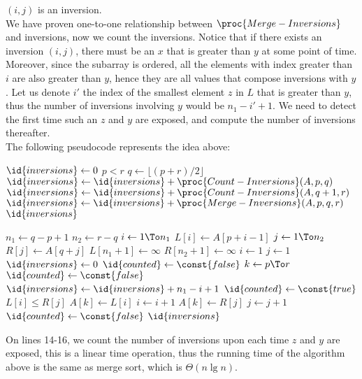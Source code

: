 \begin{enumerate}[leftmargin=*]
		$(i,j)$ is an inversion.\\
		We have proven one-to-one relationship between
		$\proc{Merge-Inversions}$ and inversions, now
		we count the inversions. Notice that if there
		exists an inversion $(i,j)$, there must be
		an $x$ that is greater than $y$ at some point
		of time. Moreover, since the subarray is ordered, 
		all the elements with index greater than $i$ are
		also greater than $y$, hence they are all
		values that compose inversions with $y$. Let
		us denote $i'$ the index of the smallest element
		$z$ in $L$ that is greater than $y$, thus the 
		number of inversions involving $y$ would be
		$n_1-i'+1$. We need to detect the first time
		such an $z$ and $y$ are exposed, and compute
		the number of inversions thereafter.\\
		The following pseudocode represents the idea
		above:
		\begin{codebox}
		\li	$\id{inversions}\gets 0$
		\li	\If $p<r$
			\Then
		\li		$q\gets\lfloor(p+r)/2\rfloor$
		\li		$\id{inversions}\gets\id{inversions}
				+\proc{Count-Inversions}(A,p,q)$
		\li		$\id{inversions}\gets\id{inversions}
				+\proc{Count-Inversions}(A,q+1,r)$
		\li		$\id{inversions}\gets\id{inversions}
				+\proc{Merge-Inversions}(A,p,q,r)$
			\End
		\li {} $\id{inversions}$
		\end{codebox}
		\begin{codebox}
		\Procname{$\proc{Merge-Inversions}(A,p,q,r)$}
		\li	$n_1\gets q-p+1$
		\li	$n_2\gets r-q$
		\li \For $i\gets 1\To n_1$
			\Do
		\li		$L[i]\gets A[p+i-1]$
			\End
		\li \For $j\gets 1\To n_2$
			\Do
		\li		$R[j]\gets A[q+j]$
			\End
		\li	$L[n_1+1]\gets \infty$
		\li	$R[n_2+1]\gets \infty$
		\li $i\gets 1$
		\li $j\gets 1$
		\li $\id{inversions}\gets 0$
		\li $\id{counted}\gets \const{false}$
		\li \For $k\gets p\To r$
			\Do
		\li		\If $\id{counted}\gets \const{false}$
				\Then
		\li			$\id{inversions}\gets\id{inversions}
					+n_1-i+1$
		\li			$\id{counted}\gets \const{true}$
				\End
		\li		\If $L[i]\le R[j]$ 
				\Then
		\li			$A[k]\gets L[i]$
		\li			$i\gets i+1$
		\li		\Else
		\li			$A[k]\gets R[j]$
		\li			$j\gets j+1$
		\li			$\id{counted}\gets\const{false}$
				\End
			\End
		\li	{} $\id{inversions}$
		\end{codebox}
		On lines 14-16, we count the number of
		inversions upon each time $z$ and $y$ are
		exposed, this is a linear time operation, 
		thus the running time of the algorithm above 
		is the same as merge sort, which is $\Theta(n\lg n)$.
\end{enumerate}
